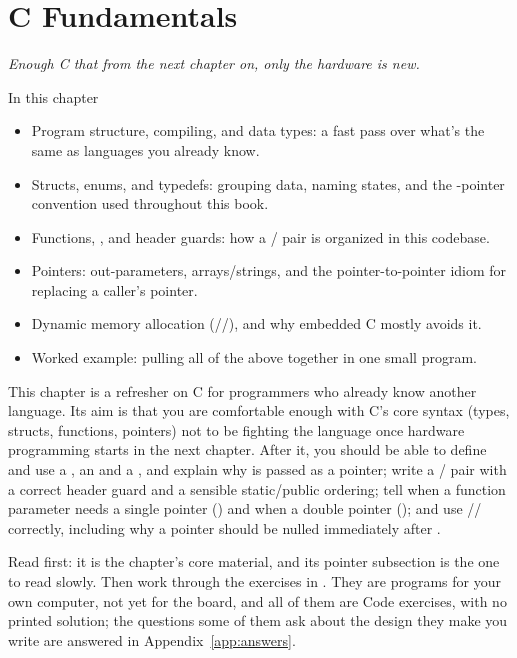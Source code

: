 
\chapter{C Fundamentals}
\label{c1:ch}

{\large\itshape Enough C that from the next chapter on, only the hardware is new.\par}

\begin{chapterbox}{In this chapter}
\begin{itemize}
  \item Program structure, compiling, and data types: a fast pass over what's the same as languages
    you already know.
  \item Structs, enums, and typedefs: grouping data, naming states, and the -pointer
    convention used throughout this book.
  \item Functions, , and header guards: how a / pair is organized in
    this codebase.
  \item Pointers: out-parameters, arrays/strings, and the pointer-to-pointer idiom for replacing a
    caller's pointer.
  \item Dynamic memory allocation (//), and why embedded C
    mostly avoids it.
  \item Worked example: pulling all of the above together in one small program.
\end{itemize}
\end{chapterbox}

This chapter is a refresher on C for programmers who already know another language. Its aim is that
you are comfortable enough with C's core syntax (types, structs, functions, pointers) not to be
fighting the language once hardware programming starts in the next chapter. After it, you should be
able to define and use a , an  and a , and explain why
 is passed as a pointer; write a / pair with a correct header guard
and a sensible static/public ordering; tell when a function parameter needs a single pointer
() and when a double pointer (); and use
// correctly, including why a pointer should be nulled
immediately after .

Read  first: it is the chapter's core material, and its pointer
subsection is the one to read slowly. Then work through the exercises in .
They are programs for your own computer, not yet for the board, and all of them are Code exercises,
with no printed solution; the questions some of them ask about the design they make you write are
answered in Appendix~\ref{app:answers}.




